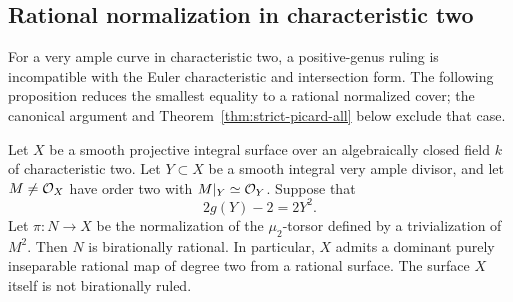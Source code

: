 \subsection{Rational normalization in characteristic two}

For a very ample curve in characteristic two, a positive-genus ruling is incompatible with the Euler characteristic and intersection form. The following proposition reduces the smallest equality to a rational normalized cover; the canonical argument and Theorem~\ref{thm:strict-picard-all} below exclude that case.

\begin{proposition}\label{prop:characteristic-two-rational-normalization}
Let $X$ be a smooth projective integral surface over an algebraically
closed field $k$ of characteristic two. Let $Y\subset X$ be a smooth
integral very ample divisor, and let $M\ne\mathcal O_X$ have order two with
$M|_Y\simeq\mathcal O_Y$. Suppose that
\[
 2g(Y)-2=2Y^2.
\]
Let $\pi:N\to X$ be the normalization of the $\mu_2$-torsor defined by a
trivialization of $M^2$. Then $N$ is birationally rational. In particular,
$X$ admits a dominant purely inseparable rational map of degree two
from a rational surface. The surface $X$ itself is not birationally
ruled.
\end{proposition}


